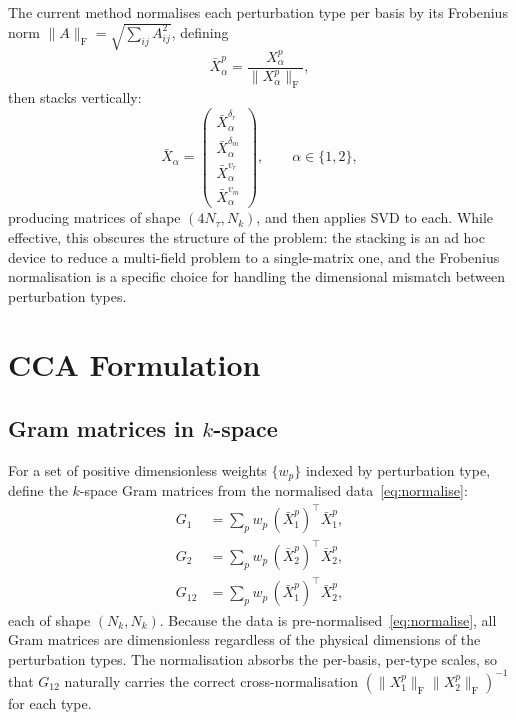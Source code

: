 \documentclass[a4paper,11pt]{article}
\newcommand{\Xb}[2]{X_{#1}^{#2}}
\newcommand{\Xn}[2]{\bar{X}_{#1}^{#2}}
\newcommand{\Gb}[1]{G_{#1}}
\newcommand{\frob}[1]{\lVert #1 \rVert_{\mathrm{F}}}
\newcommand{\Nk}{N_k}
\newcommand{\Nt}{N_\tau}
\theoremstyle{plain}
\begin{document}
The current method normalises each perturbation type per basis by its Frobenius norm $\frob{A} = \sqrt{\sum_{ij} A_{ij}^2}$, defining
\begin{equation}
    \Xn{\alpha}{p} = \frac{\Xb{\alpha}{p}}{\frob{\Xb{\alpha}{p}}},
    \label{eq:normalise}
\end{equation}
then stacks vertically:
\begin{equation}
    \bar{X}_\alpha = \begin{pmatrix} \Xn{\alpha}{\delta_r} \\ \Xn{\alpha}{\delta_m} \\ \Xn{\alpha}{v_r} \\ \Xn{\alpha}{v_m} \end{pmatrix}, \qquad \alpha \in \{1, 2\},
    \label{eq:stacking}
\end{equation}
producing matrices of shape $(4\Nt, \Nk)$, and then applies SVD to each.
While effective, this obscures the structure of the problem: the stacking is an ad hoc device to reduce a multi-field problem to a single-matrix one, and the Frobenius normalisation is a specific choice for handling the dimensional mismatch between perturbation types.

\section{CCA Formulation}
\label{sec:cca}

\subsection{Gram matrices in $k$-space}
\label{sec:gram}

For a set of positive dimensionless weights $\{w_p\}$ indexed by perturbation type, define the $k$-space Gram matrices from the normalised data~\eqref{eq:normalise}:
\begin{align}
    \Gb{1} &= \sum_p w_p \, (\Xn{1}{p})^\top \Xn{1}{p}, \label{eq:G1} \\
    \Gb{2} &= \sum_p w_p \, (\Xn{2}{p})^\top \Xn{2}{p}, \label{eq:G2} \\
    \Gb{12} &= \sum_p w_p \, (\Xn{1}{p})^\top \Xn{2}{p}, \label{eq:G12}
\end{align}
each of shape $(\Nk, \Nk)$.
Because the data is pre-normalised~\eqref{eq:normalise}, all Gram matrices are dimensionless regardless of the physical dimensions of the perturbation types.
The normalisation absorbs the per-basis, per-type scales, so that $\Gb{12}$ naturally carries the correct cross-normalisation $(\frob{\Xb{1}{p}} \frob{\Xb{2}{p}})^{-1}$ for each type.
\end{document}
